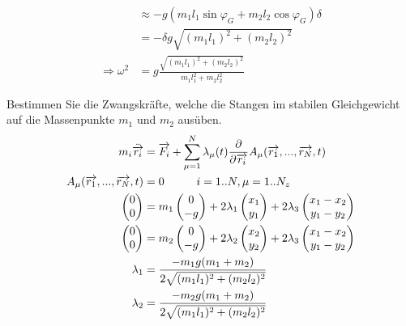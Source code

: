 \begin{enumeralph}
\begin{align*}
	&\approx-g(m_1l_1\sin\varphi_G+m_2l_2\cos\varphi_G)\delta\\
	&=-\delta g\sqrt{(m_1l_1)^2+(m_2l_2)^2}\\
	\Rightarrow \omega^2&=g\frac{\sqrt{(m_1l_1)^2+(m_2l_2)^2}}{m_1l_1^2 + m_2l_2^2}
	\end{align*}
	\item Bestimmen Sie die Zwangskräfte, welche die Stangen im stabilen Gleichgewicht auf die Massenpunkte $m_1$ und $m_2$ ausüben.
	\begin{align*}
	m_i\ddot{\overrightarrow{r_i}}&=\overrightarrow{F_i}+\sum_{\mu=1}^{N}\lambda_\mu(t)\frac{\partial}{\partial\overrightarrow{r_i}}A_\mu(\overrightarrow{r_1},...,\overrightarrow{r_N},t)\\
	A_\mu(\overrightarrow{r_1},...,\overrightarrow{r_N},t)&=0\hspace{1cm}i=1..N,\mu=1..N_z\\
	\begin{pmatrix}0\\0\end{pmatrix}&=m_1\begin{pmatrix}0\\-g\end{pmatrix}+2\lambda_1\begin{pmatrix}x_1\\y_1\end{pmatrix}+2\lambda_3\begin{pmatrix}x_1-x_2\\y_1-y_2\end{pmatrix}\\
	\begin{pmatrix}0\\0\end{pmatrix}&=m_2\begin{pmatrix}0\\-g\end{pmatrix}+2\lambda_2\begin{pmatrix}x_2\\y_2\end{pmatrix}+2\lambda_3\begin{pmatrix}x_1-x_2\\y_1-y_2\end{pmatrix}\\
	\lambda_1&=\frac{-m_1g(m_1+m_2)}{2\sqrt{(m_1l_1)^2+(m_2l_2)^2}}\\
	\lambda_2&=\frac{-m_2g(m_1+m_2)}{2\sqrt{(m_1l_1)^2+(m_2l_2)^2}}\\
	\end{align*}
\end{enumeralph}

